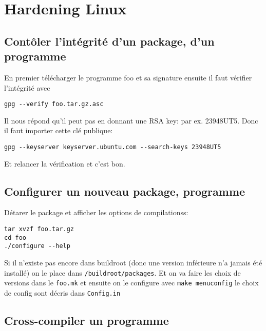 \section{Hardening Linux}
\subsection{Contôler l'intégrité d'un package, d'un programme}
En premier télécharger le programme foo et sa signature ensuite il faut vérifier l'intégrité avec
\begin{Verbatim}[breaklines=true, breakanywhere=true]
gpg --verify foo.tar.gz.asc
\end{Verbatim}
Il nous répond qu'il peut pas en donnant une RSA key: par ex. 23948UT5. Donc il faut importer cette clé publique:
\begin{Verbatim}[breaklines=true, breakanywhere=true]
gpg --keyserver keyserver.ubuntu.com --search-keys 23948UT5
\end{Verbatim}
Et relancer la vérification et c'est bon.
\subsection{Configurer un nouveau package, programme}
Détarer le package et afficher les options de compilationss:
\begin{Verbatim}[breaklines=true, breakanywhere=true]
tar xvzf foo.tar.gz
cd foo
./configure --help
\end{Verbatim}
Si il n'existe pas encore dans buildroot (donc une version inférieure n'a jamais été installé) on le place dans \verb!/buildroot/packages!.
Et on va faire les choix de versions dans le \verb!foo.mk! et ensuite on le configure avec \verb!make menuconfig! le choix de config sont décris dans \verb!Config.in!

\subsection{Cross-compiler un programme}

